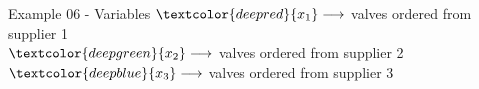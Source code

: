 \begin{frame}{Example 06 - Variables}
\LARGE{
$\textcolor{deepred}  {{x}_{1}} \longrightarrow$
    valves ordered from supplier 1  \\ \vspace{1cm}
$\textcolor{deepgreen}{{x}_{2}} \longrightarrow$
    valves ordered from supplier 2 \\ \vspace{1cm}
$\textcolor{deepblue} {{x}_{3}} \longrightarrow$
    valves ordered from supplier 3
}
\end{frame}

